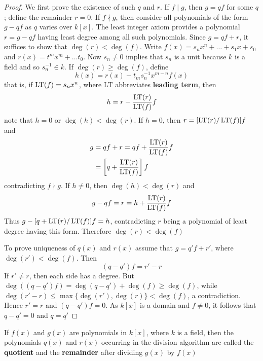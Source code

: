 \documentclass[11pt]{article}
\begin{document}
\begin{proof}
We first prove the existence of such \(q\) and \(r\). If \(f\mid g\), then
\(g=qf\) for some \(q\); define the remainder \(r=0\). If \(f\nmid g\), then
consider all polynomials of the form \(g-qf\) as \(q\) varies over \(k[x]\). The
least integer axiom provides a polynomial \(r=g-qf\) having least degree
among all such polynomials. Since \(g=qf+r\), it suffices to show that
\(\deg(r)<\deg(f)\). Write \(f(x)=s_nx^n+\dots+s_1x+s_0\) and
\(r(x)=t^mx^m+\dots t_0\). Now \(s_n\neq 0\) implies that \(s_n\) is a unit
because \(k\) is a field and so \(s_n^{-1}\in k\). If \(\deg(r)\ge\deg(f)\), define
\begin{equation*}
h(x)=r(x)-t_ms_n^{-1}x^{m-n}f(x)
\end{equation*}
that is, if \(\operatorname{LT}(f)=s_nx^n\), where LT abbreviates \textbf{leading term}, then
\begin{equation*}
h=r-\frac{\operatorname{LT}(r)}{\operatorname{LT}(f)}f
\end{equation*}
note that \(h=0\) or \(\deg(h)<\deg(r)\). If \(h=0\), then \(r=[\operatorname{LT}(r)/\operatorname{LT}(f)]f\)
and
\begin{align*}
g&=qf+r=qf+\frac{\operatorname{LT}(r)}{\operatorname{LT}(f)}f\\
&=\left[q+\frac{\operatorname{LT}(r)}{\operatorname{LT}(f)}\right]f
\end{align*}
contradicting \(f\nmid g\). If \(h\neq0\), then \(\deg(h)<\deg(r)\) and
\begin{equation*}
g-qf=r=h+\frac{\operatorname{LT}(r)}{\operatorname{LT}(f)}f
\end{equation*}
Thus \(g-[q+\operatorname{LT}(r)/\operatorname{LT}(f)]f=h\), contradicting \(r\) being a polynomial of least
degree having this form. Therefore \(\deg(r)<\deg(f)\)

To prove uniqueness of \(q(x)\) and \(r(x)\) assume that \(g=q'f+r'\), where
\(\deg(r')<\deg(f)\). Then
\begin{equation*}
(q-q')f=r'-r
\end{equation*}
If \(r'\neq r\), then each side has a degree. But
\(\deg((q-q')f)=\deg(q-q')+\deg(f)\ge\deg(f)\), while
\(\deg(r'-r)\le\max\{\deg(r'),\deg(r)\}<\deg(f)\), a contradiction. Hence
\(r'=r\) and \((q-q')f=0\). As \(k[x]\) is a domain and \(f\neq 0\), it follows that
\(q-q'=0\) and \(q=q'\)
\end{proof}

\begin{definition}[]
If \(f(x)\) and \(g(x)\) are polynomials in \(k[x]\), where \(k\) is a field, then
the polynomials \(q(x)\) and \(r(x)\) occurring in the division algorithm are
called the \textbf{quotient} and the \textbf{remainder} after dividing \(g(x)\) by \(f(x)\)
\end{definition}
\end{document}
